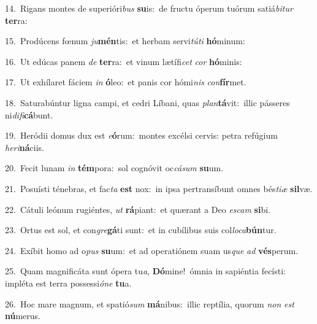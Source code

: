{\numbfont\textcolor{\numbcolor}{14.}}~Rigans montes de superióri\textit{bus} \textbf{su}\-is:~\star de fructu óperum tuórum satiá\-\textit{bi}\-\textit{tur} \textbf{ter}\-ra:\par
{\numbfont\textcolor{\numbcolor}{15.}}~Prodúcens fœnum \textit{ju}\-\textbf{mén}tis:~\star et herbam servi\-\textit{tú}\-\textit{ti} \textbf{hó}\-minum:\par
{\numbfont\textcolor{\numbcolor}{16.}}~Ut edúcas panem \textit{de} \textbf{ter}\-ra:~\star et vinum lætífi\textit{cet} \textit{cor} \textbf{hó}\-minis:\par
{\numbfont\textcolor{\numbcolor}{17.}}~Ut exhílaret fáciem \textit{in} \textbf{ó}\-leo:~\star et panis cor hómi\textit{nis} \textit{con}\-\textbf{fír}met.\par
{\numbfont\textcolor{\numbcolor}{18.}}~Saturabúntur ligna campi, et cedri Líbani, quas \textit{plan}\-\textbf{tá}vit:~\star illic pásseres ni\-\textit{di}\-\textit{fi}\textbf{cá}bunt.\par
{\numbfont\textcolor{\numbcolor}{19.}}~Heródii domus dux est \textit{e}\-\textbf{ó}rum:~\star montes excélsi cervis: petra refúgium \textit{he}\-\textit{ri}\textbf{ná}ciis.\par
{\numbfont\textcolor{\numbcolor}{20.}}~Fecit lunam \textit{in} \textbf{tém}\-pora:~\star sol cognóvit oc\-\textit{cá}\-\textit{sum} \textbf{su}\-um.\par
{\numbfont\textcolor{\numbcolor}{21.}}~Posuísti ténebras, et fac\textit{ta} \textbf{est} nox:~\star in ipsa pertransíbunt omnes bés\-\textit{ti}\-\textit{æ} \textbf{sil}\-væ.\par
{\numbfont\textcolor{\numbcolor}{22.}}~Cátuli leónum rugiéntes, \textit{ut} \textbf{rá}\-piant:~\star et quærant a Deo \textit{es}\-\textit{cam} \textbf{si}\-bi.\par
{\numbfont\textcolor{\numbcolor}{23.}}~Ortus est sol, et con\-\textit{gre}\-\textbf{gá}ti sunt:~\star et in cubílibus suis col\-\textit{lo}\-\textit{ca}\textbf{bún}tur.\par
{\numbfont\textcolor{\numbcolor}{24.}}~Exíbit homo ad o\textit{pus} \textbf{su}\-um:~\star et ad operatiónem suam us\textit{que} \textit{ad} \textbf{vés}\-perum.\par
{\numbfont\textcolor{\numbcolor}{25.}}~Quam magnificáta sunt ópera tu\-\textit{a}\-, \textbf{Dó}\-mine!~\star ómnia in sapiéntia fecísti: impléta est terra possessi\-\textit{ó}\-\textit{ne} \textbf{tu}\-a.\par
{\numbfont\textcolor{\numbcolor}{26.}}~Hoc mare magnum, et spatió\textit{sum} \textbf{má}\-nibus:~\star illic reptília, quorum \textit{non} \textit{est} \textbf{nú}\-merus.\par
